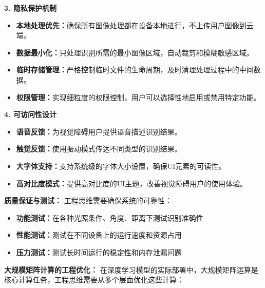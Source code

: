 \textbf{3. 隐私保护机制}
\begin{itemize}
\item \textbf{本地处理优先：}确保所有图像处理都在设备本地进行，不上传用户图像到云端。
\item \textbf{数据最小化：}只处理识别所需的最小图像区域，自动裁剪和模糊敏感区域。
\item \textbf{临时存储管理：}严格控制临时文件的生命周期，及时清理处理过程中的中间数据。
\item \textbf{权限管理：}实现细粒度的权限控制，用户可以选择性地启用或禁用特定功能。
\end{itemize}

\textbf{4. 可访问性设计}
\begin{itemize}
\item \textbf{语音反馈：}为视觉障碍用户提供语音描述识别结果。
\item \textbf{触觉反馈：}使用振动模式传达不同类型的识别结果。
\item \textbf{大字体支持：}支持系统级的字体大小设置，确保UI元素的可读性。
\item \textbf{高对比度模式：}提供高对比度的UI主题，改善视觉障碍用户的使用体验。
\end{itemize}

\textbf{质量保证与测试：}
工程思维需要确保系统的可靠性：
\begin{itemize}
\item \textbf{功能测试：}在各种光照条件、角度、距离下测试识别准确性
\item \textbf{性能测试：}测试在不同设备上的运行速度和资源占用
\item \textbf{压力测试：}测试长时间运行的稳定性和内存泄漏问题
\end{itemize}

\textbf{大规模矩阵计算的工程优化：}
在深度学习模型的实际部署中，大规模矩阵运算是核心计算任务，工程思维需要从多个层面优化这些计算：

